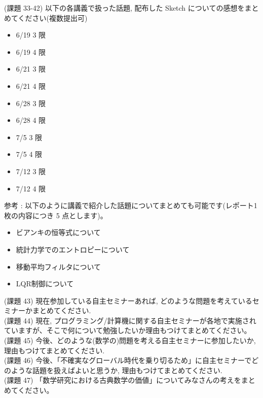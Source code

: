 \documentclass{article}
\begin{document}
\newpage \noindent
(課題 33-42) 以下の各講義で扱った話題, 配布した Sketch についての感想をまとめてください(複数提出可)
\begin{itemize}
\item 6/19 3 限
\item 6/19 4 限
\item 6/21 3 限
\item 6/21 4 限
\item 6/28 3 限
\item 6/28 4 限
\item 7/5  3 限
\item 7/5  4 限
\item 7/12  3 限
\item 7/12  4 限
\end{itemize}
参考 : 以下のように講義で紹介した話題についてまとめても可能です(レポート1枚の内容につき 5 点とします)。
\begin{itemize}
\item ビアンキの恒等式について
\item 統計力学でのエントロピーについて
\item 移動平均フィルタについて
\item LQR制御について
\end{itemize}
(課題 43) 現在参加している自主セミナーあれば, どのような問題を考えているセミナーかまとめてください.\\
(課題 44) 現在, プログラミング/計算機に関する自主セミナーが各地で実施されていますが、そこで何について勉強したいか理由もつけてまとめてください。\\
(課題 45) 今後、どのような(数学の)問題を考える自主セミナーに参加したいか, 理由もつけてまとめてください.\\
(課題 46) 今後、「不確実なグローバル時代を乗り切るため」に自主セミナーでどのような話題を扱えばよいと思うか, 理由もつけてまとめてください.\\
(課題 47) 「数学研究における古典数学の価値」についてみなさんの考えをまとめてください。\\
\end{document}
